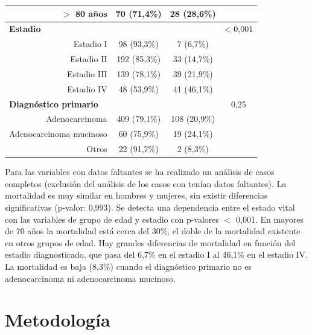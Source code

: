 \begin{table}[H]
\begin{tabular}{rccc}
		$>$ 80 años                                    & 70 (71,4\%)    & 28 (28,6\%)         &                  \\ \hline
		\multicolumn{1}{l}{\textbf{Estadio}}              &                &                     & \textless{} 0,001 \\
		Estadio I                                         & 98 (93,3\%)    & 7 (6,7\%)           &                  \\
		Estadio II                                        & 192 (85,3\%)   & 33 (14,7\%)         &                  \\
		Estadio III                                       & 139 (78,1\%)   & 39 (21,9\%)         &                  \\
		Estadio IV                                        & 48 (53,9\%)    & 41 (46,1\%)         &                  \\ \hline
		\multicolumn{1}{l}{\textbf{Diagnóstico primario}} &                &                     & 0,25             \\
		Adenocarcinoma                                    & 409 (79,1\%)   & 108 (20,9\%)        &                  \\
		Adenocarcinoma mucinoso                           & 60 (75,9\%)    & 19 (24,1\%)         &                  \\
		Otros                                             & 22 (91,7\%)    & 2 (8,3\%)           &                  \\ \hline
	\end{tabular}
\end{table}

Para las variables con datos faltantes se ha realizado un análisis de casos completos (exclusión del análisis de los casos con tenían datos faltantes).  La mortalidad es muy similar en hombres y mujeres, sin existir diferencias significativas (p-valor: 0,993). Se detecta una dependencia entre el estado vital con las variables de grupo de edad y estadio con p-valores $<$ 0,001. En mayores de 70 años la mortalidad está cerca del 30\%, el doble de la mortalidad existente en otros grupos de edad. Hay grandes diferencias de mortalidad en función del estadio diagnosticado, que pasa del 6,7\% en el estadio I al 46,1\% en el estadio IV. La mortalidad es baja (8,3\%) cuando el diagnóstico primario no es adenocarcinoma ni adenocarcinoma mucinoso.

\section{Metodología}

